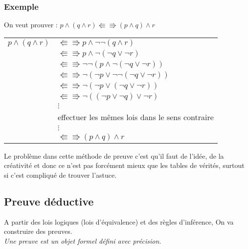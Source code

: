 			\subsubsection*{Exemple}
			On veut prouver : $p \land (q \land r) \Lleftarrow \Rrightarrow (p \land q) \land r$
			\begin{center}
			\begin{tabular}{ll}
			
			$p \land (q \land r)$ & $\Lleftarrow \Rrightarrow p \land \lnot \lnot (q \land r)$\\
			& $\Lleftarrow \Rrightarrow p \land \lnot (\lnot q \lor \lnot r)$\\
			& $\Lleftarrow \Rrightarrow \lnot \lnot (p \land \lnot (\lnot q \lor \lnot r))$\\
			& $\Lleftarrow \Rrightarrow \lnot (\lnot p \lor \lnot \lnot (\lnot q \lor \lnot r))$\\
			& $\Lleftarrow \Rrightarrow \lnot (\lnot p \lor (\lnot q \lor \lnot r))$\\
			& $\Lleftarrow \Rrightarrow \lnot ((\lnot p \lor \lnot q) \lor \lnot r)$\\
			&$\vdots$\\
			& effectuer les mêmes lois dans le sens contraire \\
			&$\vdots$\\
			& $\Lleftarrow \Rrightarrow (p \land q) \land r$\\
			\end{tabular}
			\end{center}
			Le problème dans cette méthode de preuve c'est qu'il faut de l'idée, de la créativité et donc ce n'est pas forcément mieux que les tables de vérités, surtout si c'est compliqué de trouver l'astuce.
		
		\subsection{Preuve déductive}
		A partir des lois logiques (lois d'équivalence) et des règles d'inférence, On va construire des preuves.\\
		\textit{Une preuve est un objet formel défini avec précision.\\}
		
